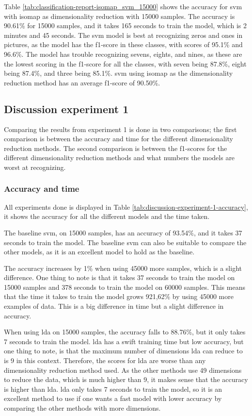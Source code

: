 Table \ref{tab:classification-report-isomap_svm_15000} shows the accuracy for \gls{svm} with \gls{isomap} as dimensionality reduction with 15000 samples. The accuracy is 90.61\% for 15000 samples, and it takes 165 seconds to train the model, which is 2 minutes and 45 seconds. The \gls{svm} model is best at recognizing zeros and ones in pictures, as the model has the f1-score in these classes, with scores of 95.1\% and 96.6\%. The model has trouble recognizing sevens, eights, and nines, as these are the lowest scoring in the f1-score for all the classes, with seven being 87.8\%, eight being 87.4\%, and three being 85.1\%. \gls{svm} using \gls{isomap} as the dimensionality reduction method has an average f1-score of 90.50\%.

\subsection{Discussion experiment 1}\label{sec:discussion-experiment-1}
Comparing the results from experiment 1 is done in two comparisons; the first comparison is between the accuracy and time for the different dimensionality reduction methods. The second comparison is between the f1-scores for the different dimensionality reduction methods and what numbers the models are worst at recognizing. 

\subsubsection{Accuracy and time}\label{subsec:discussion-experiment-1-accuracy}
All experiments done is displayed in Table \ref{tab:discussion-experiment-1-accuracy}, it shows the accuracy for all the different models and the time taken.


The baseline \gls{svm}, on 15000 samples, has an accuracy of 93.54\%, and it takes 37 seconds to train the model. The baseline \gls{svm} can also be suitable to compare the other models, as it is an excellent model to hold as the baseline.

The accuracy increases by 1\% when using 45000 more samples, which is a slight difference. One thing to note is that it takes 37 seconds to train the model on 15000 samples and 378 seconds to train the model on 60000 samples. This means that the time it takes to train the model grows 921,62\% by using 45000 more examples of data. This is a big difference in time but a slight difference in accuracy.

When using \gls{lda} on 15000 samples, the accuracy falls to 88.76\%, but it only takes 7 seconds to train the model. \gls{lda} has a swift training time but low accuracy, but one thing to note, is that the maximum number of dimensions \gls{lda} can reduce to is 9 in this context. Therefore, the scores for \gls{lda} are worse than any dimensionality reduction method used. As the other methods use 49 dimensions to reduce the data, which is much higher than 9, it makes sense that the accuracy is higher than \gls{lda}. \gls{lda} only takes 7 seconds to train the model, so it is an excellent method to use if one wants a fast model with lower accuracy by comparing the other methods with more dimensions. 

